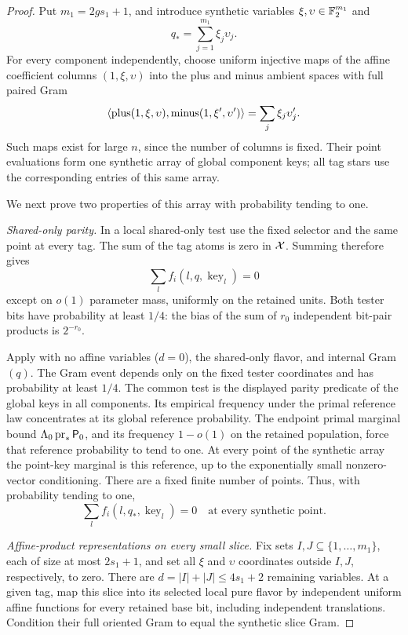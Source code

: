 \begin{proof}
Put \(m_1=2gs_1+1\), and introduce synthetic variables
\(\xi,\upsilon\in\mathbb F_2^{m_1}\) and
\[
 q_*=\sum_{j=1}^{m_1}\xi_j\upsilon_j.
 \]
For every component independently, choose uniform injective
maps of the affine coefficient columns
\((1,\xi,\upsilon)\) into the plus and minus ambient spaces
with full paired Gram
\[
 \langle \text{plus}(1,\xi,\upsilon),\text{minus}(1,\xi',\upsilon')\rangle
 =\sum_j\xi_j\upsilon'_j.
 \]
Such maps exist for large \(n\), since the number of columns
is fixed.  Their point evaluations form one synthetic array
of global component keys; all tag stars use the corresponding
entries of this same array.

We next prove two properties of this array with probability
tending to one.

\medskip\noindent
\emph{Shared-only parity.}
In a local shared-only test use the fixed selector and the
same point at every tag.  The sum of the tag atoms is zero
in \(\mathcal X\).  Summing  therefore gives
\[
 \sum_l f_i(l,q,\operatorname{key}_l)=0
 \]
except on \(o(1)\) parameter mass, uniformly on the retained
units.  Both tester bits have probability at least \(1/4\):
the bias of the sum of \(r_0\) independent bit-pair products
is \(2^{-r_0}\).

Apply  with no affine variables
(\(d=0\)), the shared-only flavor, and internal Gram \((q)\).
The Gram event depends only on the fixed tester coordinates
and has probability at least \(1/4\).  The common test is
the displayed parity predicate of the global keys in all
components.  Its empirical frequency under the primal reference
law concentrates at its global reference probability.  The
endpoint primal marginal bound
\(\Lambda_0\operatorname{pr}_*{\mathsf P_0}\), and its frequency
\(1-o(1)\) on the retained population, force that reference
probability to tend to one.
At every point of the synthetic array the point-key marginal
is this reference, up to the exponentially small nonzero-vector
conditioning.  There are a fixed finite number of points.
Thus, with probability tending to one,
\begin{equation}
 \sum_l f_i(l,q_*,\operatorname{key}_l)=0
 \quad\text{at every synthetic point}.
 \label{eq:synthetic-parity}
\end{equation}

\medskip\noindent
\emph{Affine-product representations on every small slice.}
Fix sets \(I,J\subseteq\{1,\ldots,m_1\}\), each of size at
most \(2s_1+1\), and set all \(\xi\) and \(\upsilon\)
coordinates outside \(I,J\), respectively, to zero.
There are \(d=|I|+|J|\le4s_1+2\) remaining variables.
At a given tag, map this slice into its selected local pure
flavor by independent uniform affine functions for every
retained base bit, including independent translations.
Condition their full oriented Gram to equal the synthetic
slice Gram.


\end{proof}
